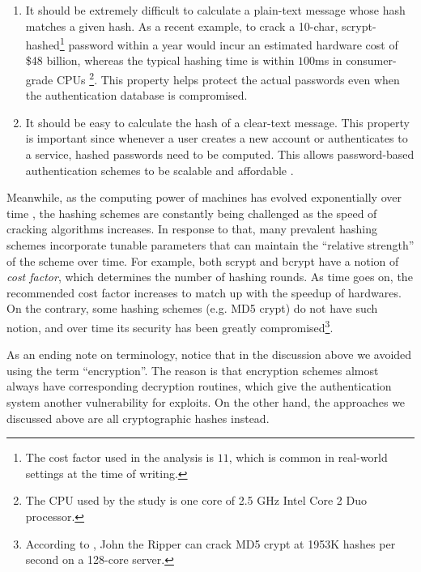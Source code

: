 \documentclass{article} %
\theoremstyle{definition}
\theoremstyle{theorem}
\theoremstyle{remark}
\theoremstyle{remark}
\begin{document}
\begin{enumerate}
    \item It should be extremely difficult to calculate a plain-text message whose hash matches a given hash. As a recent example, to crack a 10-char, scrypt-hashed\footnote{The cost factor used in the analysis is $11$, which is common in real-world settings at the time of writing.} password within a year would incur an estimated hardware cost of \$48 billion, whereas the typical hashing time is within $100$ms in consumer-grade CPUs \footnote{The CPU used by the study is one core of 2.5 GHz Intel Core 2 Duo processor.}\cite{scrypt}. This property helps protect the actual passwords even when the authentication database is compromised.

    \item It should be easy to calculate the hash of a clear-text message. This property is important since whenever a user creates a new account or authenticates to a service, hashed passwords need to be computed. This allows password-based authentication schemes to be scalable and affordable \cite{persistence}.
\end{enumerate}

\par\quad Meanwhile, as the computing power of machines has evolved exponentially over time \cite{moore}, the hashing schemes are constantly being challenged as the speed of cracking algorithms increases. In response to that, many prevalent hashing schemes incorporate tunable parameters that can maintain the ``relative strength'' of the scheme over time. For example, both scrypt and bcrypt have a notion of \emph{cost factor}, which determines the number of hashing rounds. As time goes on, the recommended cost factor increases to match up with the speedup of hardwares. On the contrary, some hashing schemes (e.g. MD5 crypt) do not have such notion, and over time its security has been greatly compromised\footnote{According to \cite{john-benchmark}, John the Ripper can crack MD5 crypt at 1953K hashes per second on a 128-core server.}.

\par\quad As an ending note on terminology, notice that in the discussion above we avoided using the term ``encryption''. The reason is that encryption schemes almost always have corresponding decryption routines, which give the authentication system another vulnerability for exploits. On the other hand, the approaches we discussed above are all cryptographic hashes instead.
\end{document}
